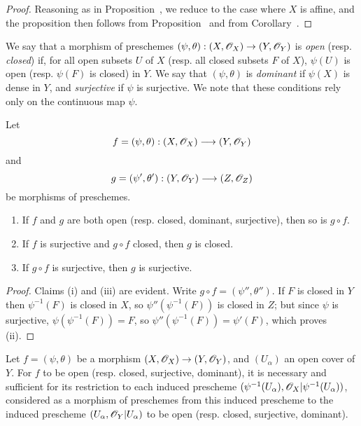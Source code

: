 \begin{proof}
\label{proof-1.2.2.5}
Reasoning as in Proposition~, we reduce to the case where $X$ is affine, and the proposition then follows from Proposition~ and from Corollary~.
\end{proof}

\begin{env}[2.2.6]
\label{1.2.2.6}
We say that a morphism of preschemes $(\psi,\theta):(X,\OO_X)\to(Y,\OO_Y)$ is \emph{open} (resp. \emph{closed}) if, for all open subsets $U$ of $X$ (resp. all closed subsets $F$ of $X$), $\psi(U)$ is open (resp. $\psi(F)$ is closed) in $Y$.
We say that $(\psi,\theta)$ is \emph{dominant} if $\psi(X)$ is dense in $Y$, and \emph{surjective} if $\psi$ is surjective.
We note that these conditions rely only on the continuous map $\psi$.
\end{env}

\begin{prop}[2.2.7]
\label{1.2.2.7}
Let
\[
  f=(\psi,\theta):(X,\OO_X)\to(Y,\OO_Y)
\]
and
\[
  g=(\psi',\theta'):(Y,\OO_Y)\to(Z,\OO_Z)
\]
be morphisms of preschemes.
\begin{enumerate}[label=\emph{(\roman*)}]
  \item If $f$ and $g$ are both open (resp. closed, dominant, surjective),
    then so is $g\circ f$.
  \item If $f$ is surjective and $g\circ f$ closed, then $g$ is closed.
  \item If $g\circ f$ is surjective, then $g$ is surjective.
\end{enumerate}
\end{prop}

\begin{proof}
\label{proof-1.2.2.7}
Claims (i) and (iii) are evident.
Write $g\circ f=(\psi'',\theta'')$.
If $F$ is closed in $Y$ then $\psi^{-1}(F)$ is closed in $X$, so $\psi''(\psi^{-1}(F))$ is closed in $Z$;
but since $\psi$ is surjective, $\psi(\psi^{-1}(F))=F$, so $\psi''(\psi^{-1}(F))=\psi'(F)$, which proves (ii).
\end{proof}

\begin{prop}[2.2.8]
\label{1.2.2.8}
Let $f=(\psi,\theta)$ be a morphism $(X,\OO_X)\to(Y,\OO_Y)$, and $(U_\alpha)$ an open cover of $Y$.
For $f$ to be open (resp. closed, surjective, dominant), it is necessary and sufficient for its restriction to each induced prescheme $(\psi^{-1}(U_\alpha),\mathscr{O}_X|\psi^{-1}(U_\alpha))$, considered as a morphism of preschemes from this induced prescheme to the induced prescheme $(U_\alpha,\mathscr{O}_Y|U_\alpha)$ to be open (resp. closed, surjective, dominant).
\end{prop}

